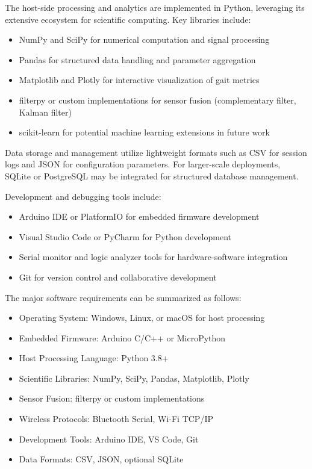 \documentclass[12pt,a4paper]{report}
\begin{document}
The host-side processing and analytics are implemented in Python, leveraging its extensive ecosystem for scientific computing. Key libraries include:
\begin{itemize}
\item NumPy and SciPy for numerical computation and signal processing

\item Pandas for structured data handling and parameter aggregation

\item Matplotlib and Plotly for interactive visualization of gait metrics

\item filterpy or custom implementations for sensor fusion (complementary filter, Kalman filter)

\item scikit-learn for potential machine learning extensions in future work
\end{itemize}
Data storage and management utilize lightweight formats such as CSV for session logs and JSON for configuration parameters. For larger-scale deployments, SQLite or PostgreSQL may be integrated for structured database management.

Development and debugging tools include:
\begin{itemize}
\item Arduino IDE or PlatformIO for embedded firmware development

\item Visual Studio Code or PyCharm for Python development

\item Serial monitor and logic analyzer tools for hardware-software integration

\item Git for version control and collaborative development
\end{itemize}
The major software requirements can be summarized as follows:

\begin{itemize}
    \item Operating System: Windows, Linux, or macOS for host processing

    \item Embedded Firmware: Arduino C/C++ or MicroPython

    \item Host Processing Language: Python 3.8+

    \item Scientific Libraries: NumPy, SciPy, Pandas, Matplotlib, Plotly

    \item Sensor Fusion: filterpy or custom implementations

    \item Wireless Protocols: Bluetooth Serial, Wi-Fi TCP/IP

    \item Development Tools: Arduino IDE, VS Code, Git

    \item Data Formats: CSV, JSON, optional SQLite
\end{itemize}
\end{document}
